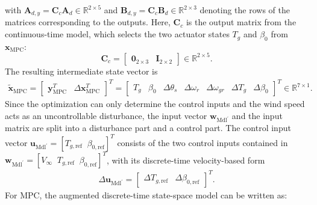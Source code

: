 with $\bm{A}_{d,y} = \bm{C}_c\bm{A}_d \in \mathbb{R}^{2 \times 5}$ and $\bm{B}_{d,y} = \bm{C}_c\bm{B}_d \in \mathbb{R}^{2 \times 3}$ denoting the rows of the matrices corresponding to the outputs. Here, $\bm{C}_c$ is the output matrix from the continuous-time model, which selects the two actuator states $T_g$ and $\beta_0$ from $\bm{x}_{\text{MPC}}$:
\[
\bm{C}_c = \begin{bmatrix} \bm{0}_{2\times3} & \bm{I}_{2\times2} \end{bmatrix} \in \mathbb{R}^{2 \times 5}.
\]
The resulting intermediate state vector is
\begin{align*}
    \tilde{\bm{x}}_{\text{MPC}} = \begin{bmatrix} \bm{y}_{\text{MPC}}^T & \Delta\bm{x}_{\text{MPC}}^T \end{bmatrix}^T = \begin{bmatrix} T_{g} & \beta_{0} & \Delta \theta_{s} & \Delta \omega_{r} & \Delta \omega_{gr} & \Delta T_{g} & \Delta \beta_{0} \end{bmatrix}^T \in \mathbb{R}^{7 \times 1}.
\end{align*}
%
Since the optimization can only determine the control inputs and the wind speed acts as an uncontrollable disturbance, the input vector $\bm{w}_{\text{Mdl}^\prime}$ and the input matrix are split into a disturbance part and a control part.
The control input vector $\bm{u}_{\text{Mdl}^\prime} = [T_{g,\text{ref}} \;\; \beta_{0,\text{ref}}]^T$ consists of the two control inputs contained in $\bm{w}_{\text{Mdl}^\prime} = [V_{\infty} \;\; T_{g,\text{ref}} \;\; \beta_{0,\text{ref}}]^T$, with its discrete-time velocity-based form
\begin{align} \label{eq:DeltaUinput}
    \Delta \bm{u}_{\text{Mdl}^\prime} = \begin{bmatrix} \Delta T_{g,\text{ref}} & \Delta \beta_{0,\text{ref}} \end{bmatrix}^T.
\end{align}
%
For MPC, the augmented discrete-time state-space model can be written as:
